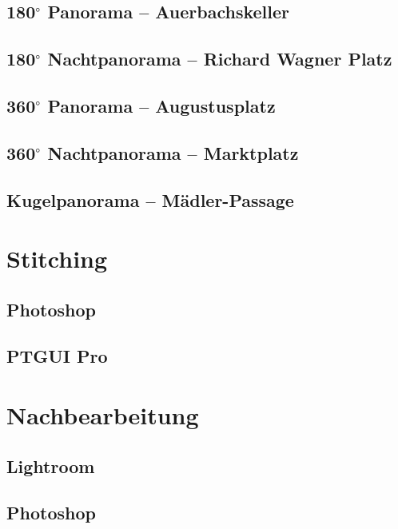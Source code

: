 \documentclass[liststotoc,bibtotoc,fontsize=14pt,]{scrreprt}
\begin{document}
	
	\section{180$^\circ$ Panorama -- Auerbachskeller}
	\label{sec:auer}

	\section{180$^\circ$ Nachtpanorama -- Richard Wagner Platz}
	\label{sec:wagner}
	
	\section{360$^\circ$ Panorama -- Augustusplatz}
	\label{sec:augustus}
	
	\section{360$^\circ$ Nachtpanorama -- Marktplatz}
	\label{sec:markt}
	
	\section{Kugelpanorama --  Mädler-Passage}
	\label{sec:kugel}
	
	\chapter{Stitching}
	\label{ch:stitiching}
	
	\section{Photoshop}
	\label{sec:photoshop}

	\section{PTGUI Pro}
	\label{sec:ptgui}
	
	\chapter{Nachbearbeitung}
	\label{ch:nach}
	
	\section{Lightroom}
	\label{sec:lightroom}
	
	\section{Photoshop}
	\label{sec:photo}
	

	
	\begin{thebibliography}{999}
	
		
	\end{thebibliography}
	
\end{document}
